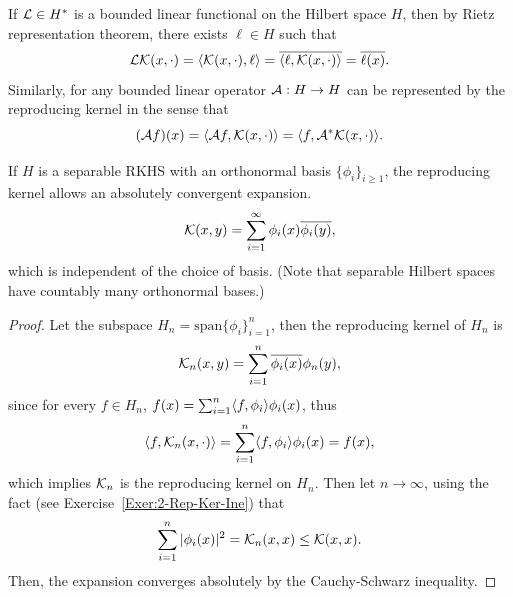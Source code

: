 \begin{example}
    If $\mathcal L\in H^{\ast}$ is a bounded linear functional on the Hilbert space $H$, then by Rietz representation theorem, there exists $\ell\in H$ such that
    \begin{equation}
        \mathcal L \mathcal K(x, \cdot) = \langle {\mathcal K(x, \cdot), \ell} \rangle = \overline{\langle {\ell, \mathcal K(x,\cdot)} \rangle} = \overline{\ell(x)}.  
    \end{equation}
    Similarly, for any bounded linear operator $\mathcal A: H\to H$ can be represented by the reproducing kernel in the sense that 
    \begin{equation}
        (\mathcal A f)(x) = \langle {\mathcal Af, \mathcal K(x, \cdot)} \rangle = \langle {f, \mathcal A^{\ast} \mathcal K(x,\cdot)} \rangle. 
    \end{equation}
\end{example}
\begin{theorem}
    If $H$ is a separable RKHS with an orthonormal basis $\{\phi_i\}_{i\ge 1}$, the reproducing kernel allows an absolutely convergent expansion.
    \begin{equation}
        \mathcal K(x, y) = \sum_{i=1}^{\infty} \phi_i(x) \overline{\phi_i(y)}, 
    \end{equation}
    which is independent of the choice of basis. (Note that separable Hilbert spaces have countably many orthonormal bases.)
\end{theorem}
\begin{proof}
     Let the subspace $H_n = \textrm{span}\{\phi_i\}_{i=1}^n$, then the reproducing kernel of $H_n$ is 
     \begin{equation*}
         \mathcal K_n(x, y) = \sum_{i=1}^n \overline{\phi_i(x)} {\phi_n(y)},
     \end{equation*}
     since for every $f\in H_n$, $f(x) = \sum_{i=1}^n \langle {f, \phi_i} \rangle \phi_i(x)$, thus 
     \begin{equation*}
         \langle {f, \mathcal K_n(x, \cdot)} \rangle = \sum_{i=1}^n \langle {f, \phi_i} \rangle \phi_i(x) = f(x),
     \end{equation*}
     which implies $\mathcal K_n$ is the reproducing kernel on $H_n$. Then let $n\to\infty$, using the fact (see Exercise~\ref{Exer:2-Rep-Ker-Ine}) that 
     \begin{equation}
         \sum_{i=1}^{n} |\phi_i(x)|^2 = \mathcal K_n(x, x) \le \mathcal K(x, x).
     \end{equation}
     Then, the expansion converges absolutely by the Cauchy-Schwarz inequality.
\end{proof}

